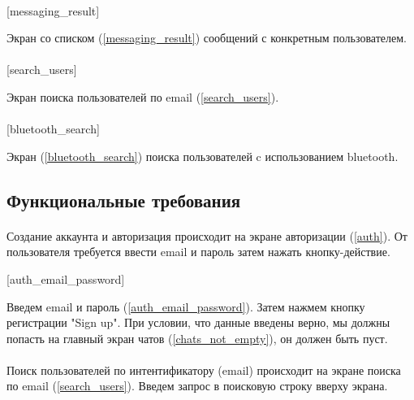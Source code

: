 \documentclass[testmethods]{espd}
\begin{document}
\paragraph{} %

[messaging_result]

Экран со списком (\ref{messaging_result}) сообщений с конкретным пользователем.

\paragraph{} %

[search_users]

Экран поиска пользователей по email (\ref{search_users}).

\paragraph{} %

[bluetooth_search]

Экран (\ref{bluetooth_search}) поиска пользователей c использованием bluetooth.

\subsection{Функциональные требования}

\paragraph{} %

Создание аккаунта и авторизация происходит на экране авторизации (\ref{auth}).
От пользователя требуется ввести email и пароль затем нажать кнопку-действие.

[auth_email_password]

Введем email и пароль (\ref{auth_email_password}). Затем нажмем кнопку регистрации "Sign up". При условии, что данные введены верно, мы должны попасть на главный экран чатов (\ref{chats_not_empty}), он должен быть пуст.

\paragraph{} %

Поиск пользователей по интентификатору (email) происходит на экране поиска по email (\ref{search_users}). Введем запрос в поисковую строку вверху экрана.
\end{document}
